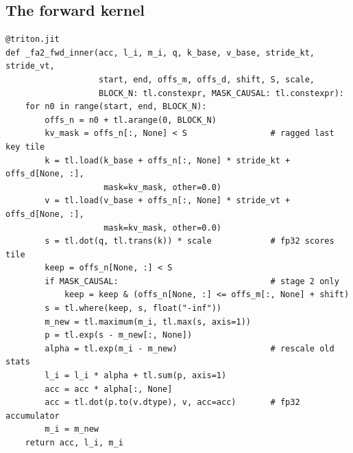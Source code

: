 \subsection{The forward kernel}

\begin{lstlisting}[caption={FA2 forward: the inner loop over key tiles (\texttt{flash2\_triton.py}, reflowed).},label={lst:perf:fa2inner}]
@triton.jit
def _fa2_fwd_inner(acc, l_i, m_i, q, k_base, v_base, stride_kt, stride_vt,
                   start, end, offs_m, offs_d, shift, S, scale,
                   BLOCK_N: tl.constexpr, MASK_CAUSAL: tl.constexpr):
    for n0 in range(start, end, BLOCK_N):
        offs_n = n0 + tl.arange(0, BLOCK_N)
        kv_mask = offs_n[:, None] < S                 # ragged last key tile
        k = tl.load(k_base + offs_n[:, None] * stride_kt + offs_d[None, :],
                    mask=kv_mask, other=0.0)
        v = tl.load(v_base + offs_n[:, None] * stride_vt + offs_d[None, :],
                    mask=kv_mask, other=0.0)
        s = tl.dot(q, tl.trans(k)) * scale            # fp32 scores tile
        keep = offs_n[None, :] < S
        if MASK_CAUSAL:                               # stage 2 only
            keep = keep & (offs_n[None, :] <= offs_m[:, None] + shift)
        s = tl.where(keep, s, float("-inf"))
        m_new = tl.maximum(m_i, tl.max(s, axis=1))
        p = tl.exp(s - m_new[:, None])
        alpha = tl.exp(m_i - m_new)                   # rescale old stats
        l_i = l_i * alpha + tl.sum(p, axis=1)
        acc = acc * alpha[:, None]
        acc = tl.dot(p.to(v.dtype), v, acc=acc)       # fp32 accumulator
        m_i = m_new
    return acc, l_i, m_i
\end{lstlisting}

